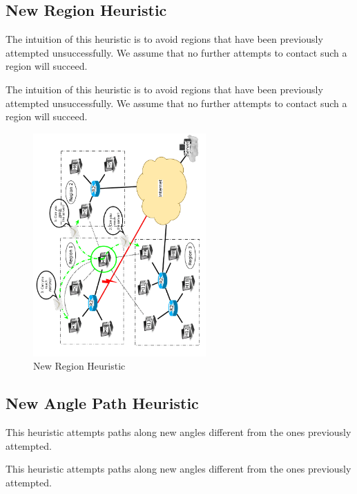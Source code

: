 \documentclass[conference]{IEEEtran}
\begin{document}
\subsection{New Region Heuristic}
The intuition of this heuristic is to avoid regions that have been previously attempted unsuccessfully.  We assume that no further attempts to contact such a region will succeed.
\begin{algorithm}
\DontPrintSemicolon
{}
\SetAlgoLined
\SetAlgoLongEnd
\scriptsize
{}
\caption{The intuition of this heuristic is to avoid regions that have been previously attempted unsuccessfully.  We assume that no further attempts to contact such a region will succeed.}
\small
\end{algorithm}

\begin{figure}[!H]
\centering
\includegraphics[width=2.6in,angle=-90]{../../images/diagrams/new_region_all}
\caption{New Region Heuristic}
\end{figure}

%
\subsection{New Angle Path Heuristic}
This heuristic attempts paths along new angles different from the ones previously attempted.
\begin{algorithm}
\DontPrintSemicolon
{}
\SetAlgoLined
\SetAlgoLongEnd
\scriptsize
{}
\caption{This heuristic attempts paths along new angles different from the ones previously attempted.}
\small
\end{algorithm}
\end{document}
